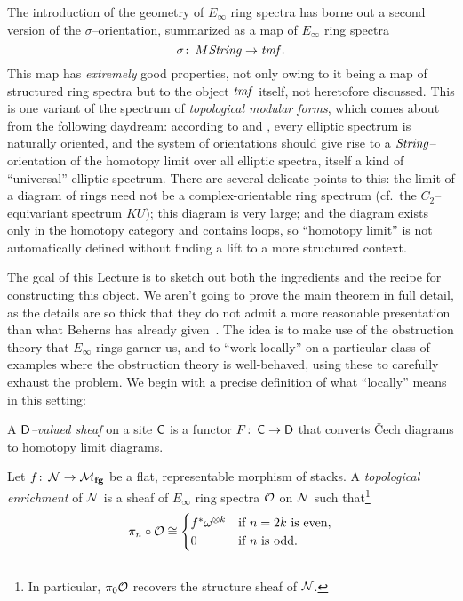 The introduction of the geometry of $E_\infty$ ring spectra has borne out a second version of the $\sigma$--orientation, summarized as a map of $E_\infty$ ring spectra \[\sigma\colon\thinspace M\mathit{String} \to \mathit{tmf}.\]  This map has \emph{extremely} good properties, not only owing to it being a map of structured ring spectra but to the object $\mathit{tmf}$ itself, not heretofore discussed.  This is one variant of the spectrum of \textit{topological modular forms}, which comes about from the following daydream: according to  and , every elliptic spectrum is naturally oriented, and the system of orientations should give rise to a $\mathit{String}$--orientation of the homotopy limit over all elliptic spectra, itself a kind of ``universal'' elliptic spectrum.  There are several delicate points to this: the limit of a diagram of rings need not be a complex-orientable ring spectrum (cf.\ the $C_2$--equivariant spectrum $KU$); this diagram is very large; and the diagram exists only in the homotopy category and contains loops, so ``homotopy limit'' is not automatically defined without finding a lift to a more structured context.

The goal of this Lecture is to sketch out both the ingredients and the recipe for constructing this object.  We aren't going to prove the main theorem in full detail, as the details are so thick that they do not admit a more reasonable presentation than what Beherns has already given~.  The idea is to make use of the obstruction theory that $E_\infty$ rings garner us, and to ``work locally'' on a particular class of examples where the obstruction theory is well-behaved, using these to carefully exhaust the problem.  We begin with a precise definition of what ``locally'' means in this setting:

\begin{definition}
A \textit{$\mathsf{D}$--valued sheaf} on a site $\mathsf{C}$ is a functor $F\colon\thinspace \mathsf{C} \to \mathsf{D}$ that converts \v{C}ech diagrams to homotopy limit diagrams.
\end{definition}

\begin{definition}
Let $f\colon\thinspace \mathcal{N} \to \mathcal{M}_{\mathbf{fg}}$ be a flat, representable morphism of stacks.  A \textit{topological enrichment} of $\mathcal{N}$ is a sheaf of $E_\infty$ ring spectra $\mathcal{O}$ on $\mathcal{N}$ such that\footnote{In particular, $\pi_0 \mathcal{O}$ recovers the structure sheaf of $\mathcal{N}$.} \[\pi_n \circ \mathcal{O} \cong \begin{cases} f^* \omega^{\otimes k} & \text{if $n = 2k$ is even}, \\ 0 & \text{if $n$ is odd}. \end{cases}\]
\end{definition}


